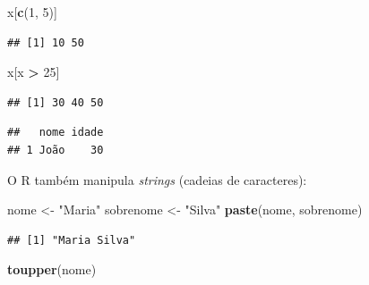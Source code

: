 \documentclass[
]{book}
\newenvironment{Shaded}{\begin{snugshade}}{\end{snugshade}}
\newcommand{\CommentTok}[1]{\textcolor[rgb]{0.56,0.35,0.01}{\textit{#1}}}
\newcommand{\DecValTok}[1]{\textcolor[rgb]{0.00,0.00,0.81}{#1}}
\newcommand{\FunctionTok}[1]{\textcolor[rgb]{0.13,0.29,0.53}{\textbf{#1}}}
\newcommand{\NormalTok}[1]{#1}
\newcommand{\OtherTok}[1]{\textcolor[rgb]{0.56,0.35,0.01}{#1}}
\newcommand{\SpecialCharTok}[1]{\textcolor[rgb]{0.81,0.36,0.00}{\textbf{#1}}}
\newcommand{\StringTok}[1]{\textcolor[rgb]{0.31,0.60,0.02}{#1}}
\begin{document}
\begin{Shaded}
\begin{Highlighting}[]
\NormalTok{x[}\FunctionTok{c}\NormalTok{(}\DecValTok{1}\NormalTok{, }\DecValTok{5}\NormalTok{)]}
\end{Highlighting}
\end{Shaded}

\begin{verbatim}
## [1] 10 50
\end{verbatim}

\begin{Shaded}
\begin{Highlighting}[]
\NormalTok{x[x }\SpecialCharTok{\textgreater{}} \DecValTok{25}\NormalTok{]}
\end{Highlighting}
\end{Shaded}

\begin{verbatim}
## [1] 30 40 50
\end{verbatim}

\begin{Shaded}
\end{Shaded}

\begin{verbatim}
##   nome idade
## 1 João    30
\end{verbatim}

O R também manipula \emph{strings} (cadeias de caracteres):

\begin{Shaded}
\begin{Highlighting}[]
\NormalTok{nome }\OtherTok{\textless{}{-}} \StringTok{"Maria"}
\NormalTok{sobrenome }\OtherTok{\textless{}{-}} \StringTok{"Silva"}
\FunctionTok{paste}\NormalTok{(nome, sobrenome)}
\end{Highlighting}
\end{Shaded}

\begin{verbatim}
## [1] "Maria Silva"
\end{verbatim}

\begin{Shaded}
\begin{Highlighting}[]
\FunctionTok{toupper}\NormalTok{(nome)}
\end{Highlighting}
\end{Shaded}
\end{document}
